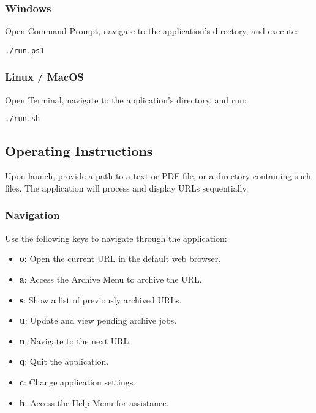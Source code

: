 \subsubsection{Windows}

Open Command Prompt, navigate to the application's directory, and execute:

\begin{lstlisting}
./run.ps1
\end{lstlisting}

\subsubsection{Linux / MacOS}

Open Terminal, navigate to the application's directory, and run:

\begin{lstlisting}[language=bash]
./run.sh
\end{lstlisting}

\subsection{Operating Instructions}

Upon launch, provide a path to a text or PDF file, or a directory containing such files. The application will process and display URLs sequentially.

\subsubsection{Navigation}

Use the following keys to navigate through the application:

\begin{itemize}
	\item \textbf{o}: Open the current URL in the default web browser.
	\item \textbf{a}: Access the Archive Menu to archive the URL.
	\item \textbf{s}: Show a list of previously archived URLs.
	\item \textbf{u}: Update and view pending archive jobs.
	\item \textbf{n}: Navigate to the next URL.
	\item \textbf{q}: Quit the application.
	\item \textbf{c}: Change application settings.
	\item \textbf{h}: Access the Help Menu for assistance.
\end{itemize}

